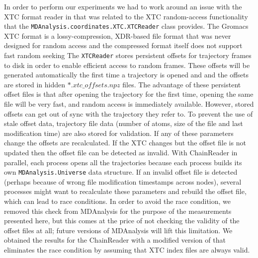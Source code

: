 In order to perform our experiments we had to work around an issue with the XTC format reader in  that was related to the XTC random-access functionality that the \texttt{MDAnalysis.coordinates.XTC.XTCReader} class provides.
The Gromacs XTC format \citep{Lindahl01, Spangberg:2011zr} is a lossy-compression, XDR-based file format that was never designed for random access and the compressed format itself does not support fast random seeking
The \texttt{XTCReader} stores persistent offsets for trajectory frames to disk \citep{Gowers:2016aa} in order to enable efficient access to random frames.
These offsets will be generated automatically the first time a trajectory is opened and and the offsets are stored in hidden $\ast.xtc\_offsets.npz$ files. 
The advantage of these persistent offset files is that after opening the trajectory for the first time, opening the same file will be very fast, and random access is immediately available. 
However, stored offsets can get out of sync with the trajectory they refer to. 
To prevent the use of stale offset data, trajectory file data (number of atoms, size of the file and last modification time) are also stored for validation.
If any of these parameters change the offsets are recalculated. 
If the XTC changes but the offset file is not updated then the offset file can be detected as invalid.
With ChainReader in parallel, each process opens all the trajectories because each process builds its own \texttt{MDAnalysis.Universe} data structure.
If an invalid offset file is detected (perhaps because of wrong file modification timestamps across nodes), several processes might want to recalculate these parameters and rebuild the offset file, which can lead to race conditions.
In order to avoid the race condition, we removed this check from MDAnalysis for the purpose of the measurements presented here, but this comes at the price of not checking the validity of the offset files at all; future versions of MDAnalysis will lift this limitation.  
We obtained the results for the ChainReader with a modified version of  that eliminates the race condition by assuming that XTC index files are always valid.

